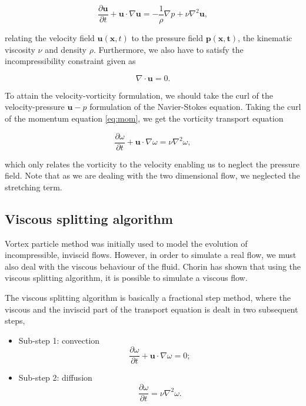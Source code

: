 	\begin{equation}
	\frac{\partial \mathbf{u}}{\partial t} + \mathbf{u}\cdot\nabla\mathbf{u} = - \frac{1}{\rho} \nabla p + \nu \nabla^2\mathbf{u},
	\label{eq:mom}
	\end{equation}

relating the velocity field $\mathbf{u}\left(\mathbf{x},t\right)$ to the pressure field $\mathbf{p\left(\mathbf{x},t\right)}$, the kinematic viscosity $\nu$ and density $\rho$. Furthermore, we also have to satisfy the incompressibility constraint given as

	\begin{equation}
	\nabla\cdot\mathbf{u} = 0.
	\end{equation}

To attain the velocity-vorticity formulation, we should take the curl of the velocity-pressure $\mathbf{u}-p$ formulation of the Navier-Stokes equation. Taking the curl of the momentum equation \ref{eq:mom}, we get the vorticity transport equation

	\begin{equation}
	\frac{\partial \omega}{\partial t} + \mathbf{u}\cdot\nabla\omega = \nu \nabla^2 \omega,
	\end{equation}

which only relates the vorticity to the velocity enabling us to neglect the pressure field. Note that as we are dealing with the two dimensional flow, we neglected the stretching term. 


\subsection{Viscous splitting algorithm}
Vortex particle method was initially used to model the evolution of incompressible, inviscid flows. However, in order to simulate a real flow, we must also deal with the viscous behaviour of the fluid. Chorin \cite{Chorin1973} has shown that using the viscous splitting algorithm, it is possible to simulate a viscous flow. 

The viscous splitting algorithm is basically a fractional step method, where the viscous and the inviscid part of the transport equation is dealt in two subsequent steps, 

	\begin{itemize}
	\item Sub-step 1: convection
		\begin{equation}
		\frac{\partial\omega}{\partial t} + \mathbf{u}\cdot\nabla\omega=0;
		\label{eq:convectionEulerian}
		\end{equation}
		
	\item Sub-step 2: diffusion
		\begin{equation}
		\frac{\partial\omega}{\partial t} = \nu\nabla^2\omega.
		\label{eq:vsa2}
		\end{equation}
	
	\end{itemize}

